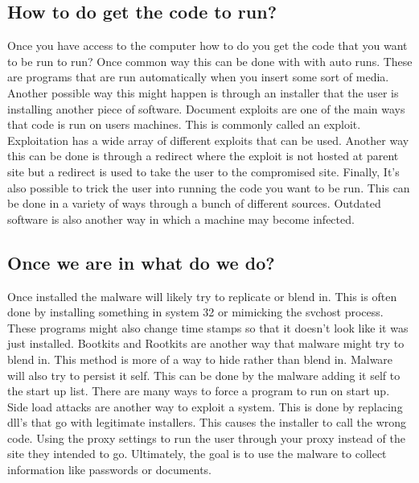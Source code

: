 \documentclass[letterpaper, onecolumn,10pt]{IEEEtran}
\begin{document}
            \subsection{How to do get the code to run?}
            Once you have access to the computer how to do you get the code that you want to be run to run? Once common way this can be done with with auto runs. These are programs that are run automatically when you insert some sort of media. Another possible way this might happen is through an installer that the user is installing another piece of software. Document exploits are one of the main ways that code is run on users machines. This is commonly called an exploit. Exploitation has a wide array of different exploits that can be used. Another way this can be done is through a redirect where the exploit is not hosted at parent site but a redirect is used to take the user to the compromised site. Finally, It's also possible to trick the user into running the code you want to be run. This can be done in a variety of ways through a bunch of different sources. Outdated software is also another way in which a machine may become infected.\\
            
            \subsection{Once we are in what do we do?}
            Once installed the malware will likely try to replicate or blend in. This is often done by installing something in system 32 or mimicking the svchost process. These programs might also change time stamps so that it doesn't look like it was just installed. Bootkits and Rootkits are another way that malware might try to blend in. This method is more of a way to hide rather than blend in. Malware will also try to persist it self. This can be done by the malware adding it self to the start up list. There are many ways to force a program to run on start up. Side load attacks are another way to exploit a system. This is done by replacing dll's that go with legitimate installers. This causes the installer to call the wrong code. Using the proxy settings to run the user through your proxy instead of the site they intended to go. Ultimately, the goal is to use the malware to collect information like passwords or documents.\\
            
\end{document}
